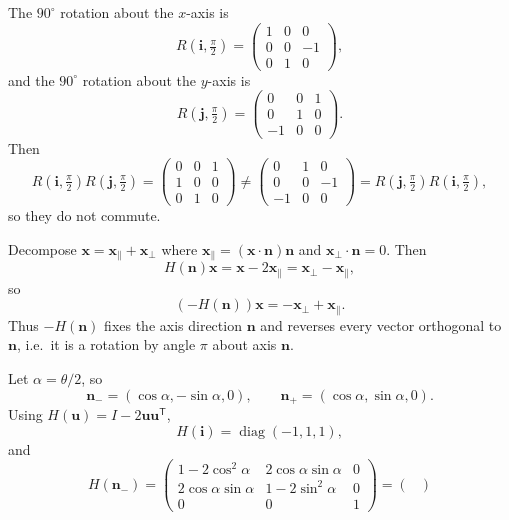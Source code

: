 \begin{solution}
\par\noindent\textbullet\quad The $90^\circ$ rotation about the $x$-axis is
	\[
	R(\mathbf i,\tfrac{\pi}{2})=
	\begin{pmatrix}
		1&0&0\\
		0&0&-1\\
		0&1&0
	\end{pmatrix},
	\]
	and the $90^\circ$ rotation about the $y$-axis is
	\[
	R(\mathbf j,\tfrac{\pi}{2})=
	\begin{pmatrix}
		0&0&1\\
		0&1&0\\
		-1&0&0
	\end{pmatrix}.
	\]
	Then
	\[
	R(\mathbf i,\tfrac{\pi}{2})R(\mathbf j,\tfrac{\pi}{2})
	=
	\begin{pmatrix}
		0&0&1\\
		1&0&0\\
		0&1&0
	\end{pmatrix}
	\neq
	\begin{pmatrix}
		0&1&0\\
		0&0&-1\\
		-1&0&0
	\end{pmatrix}
	=
	R(\mathbf j,\tfrac{\pi}{2})R(\mathbf i,\tfrac{\pi}{2}),
	\]
	so they do not commute.
	\par\noindent\textbullet\quad Decompose $\mathbf x=\mathbf x_\parallel+\mathbf x_\perp$ where
	$\mathbf x_\parallel=(\mathbf x\cdot\mathbf n)\mathbf n$ and $\mathbf x_\perp\cdot\mathbf n=0$.
	Then
	\[
	H(\mathbf n)\mathbf x=\mathbf x-2\mathbf x_\parallel=\mathbf x_\perp-\mathbf x_\parallel,
	\]
	so
	\[
	(-H(\mathbf n))\mathbf x=-\mathbf x_\perp+\mathbf x_\parallel.
	\]
	Thus $-H(\mathbf n)$ fixes the axis direction $\mathbf n$ and reverses every vector orthogonal to $\mathbf n$, i.e.\ it is a rotation by angle $\pi$ about axis $\mathbf n$.
	\par\noindent\textbullet\quad Let $\alpha=\theta/2$, so
	\[
	\mathbf n_-=(\cos\alpha,-\sin\alpha,0),\qquad \mathbf n_+=(\cos\alpha,\sin\alpha,0).
	\]
	Using $H(\mathbf u)=I-2\mathbf u\mathbf u^{\mathsf T}$,
	\[
	H(\mathbf i)=\operatorname{diag}(-1,1,1),
	\]
	and
	\[
	H(\mathbf n_-)=
	\begin{pmatrix}
		1-2\cos^2\alpha & 2\cos\alpha\sin\alpha & 0\\
		2\cos\alpha\sin\alpha & 1-2\sin^2\alpha & 0\\
		0&0&1
	\end{pmatrix}
	=
	\begin{pmatrix}

\end{pmatrix}\]
\end{solution}
